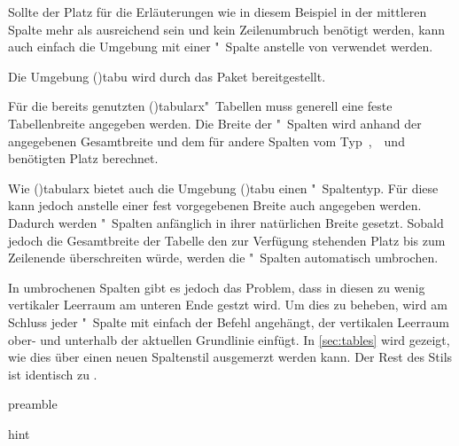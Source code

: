 \documentclass[%
  english,ngerman,%
  cdgeometry=no,DIV=12,%
  cd=false,cdfont=false,cdtitle=true,%
  headings=normal,%
  automark,%
  listof=toc,%
]{tudscrartcl}
\begin{document}
Sollte der Platz für die Erläuterungen wie in diesem Beispiel in der mittleren 
Spalte mehr als ausreichend sein und kein Zeilenumbruch benötigt werden, kann 
auch einfach die Umgebung  mit einer "~Spalte 
anstelle von  verwendet werden.



Die Umgebung \Environment(){tabu} wird durch das Paket 
 bereitgestellt. 

Für die bereits genutzten \Environment(){tabularx}"~Tabellen 
muss generell eine feste Tabellenbreite angegeben werden. Die Breite der 
"~Spalten wird anhand der angegebenen Gesamtbreite und dem für andere 
Spalten vom Typ~,~~und~ benötigten Platz 
berechnet. 

Wie \Environment(){tabularx} bietet auch die Umgebung 
\Environment(){tabu} einen "~Spaltentyp. Für diese kann 
jedoch anstelle einer fest vorgegebenen Breite auch  
angegeben werden. Dadurch werden "~Spalten anfänglich in ihrer 
natürlichen Breite gesetzt. Sobald jedoch die Gesamtbreite der Tabelle den zur 
Verfügung stehenden Platz bis zum Zeilenende überschreiten würde, werden die 
"~Spalten automatisch umbrochen. 

In umbrochenen Spalten gibt es jedoch das Problem, dass in diesen zu wenig 
vertikaler Leerraum am unteren Ende gestzt wird. Um dies zu beheben, wird am 
Schluss jeder "~Spalte mit  
einfach der Befehl  angehängt, der vertikalen Leerraum ober- und 
unterhalb der aktuellen Grundlinie einfügt. In \autoref{sec:tables} wird 
gezeigt, wie dies über einen neuen Spaltenstil ausgemerzt werden kann. Der Rest 
des Stils ist identisch zu .
%
\CodeHook{\let\newglossarystyle\renewglossarystyle}
\begin{Code}[input]{preamble}

\end{Code}
\CodeHook{\glsdisablehyper}
\begin{Code}[input]{hint}
\printacronyms[style=acrotabu]
\end{Code}
\end{document}
